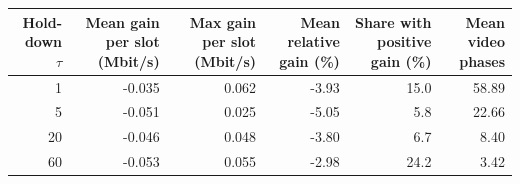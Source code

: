 \begin{tabular}{rrrrrr}
\toprule
Hold-down $\tau$ & Mean gain per slot (Mbit/s) & Max gain per slot (Mbit/s) & Mean relative gain (\%) & Share with positive gain (\%) & Mean video phases \\
\midrule
1 & -0.035 & 0.062 & -3.93 & 15.0 & 58.89 \\
5 & -0.051 & 0.025 & -5.05 & 5.8 & 22.66 \\
20 & -0.046 & 0.048 & -3.80 & 6.7 & 8.40 \\
60 & -0.053 & 0.055 & -2.98 & 24.2 & 3.42 \\
\bottomrule
\end{tabular}
